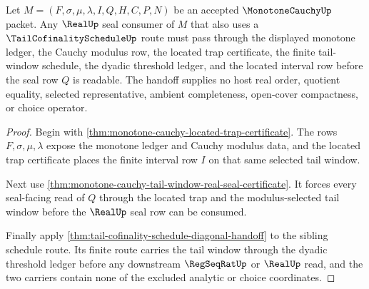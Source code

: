 \begin{theorem}
\label{thm:monotone-cauchy-window-tail-cofinality-handoff}
Let $M=(F,\sigma,\mu,\lambda,I,Q,H,C,P,N)$ be an accepted $\MonotoneCauchyUp$ packet. Any $\RealUp$ seal consumer of $M$ that also uses a $\TailCofinalityScheduleUp$ route must pass through the displayed monotone ledger, the Cauchy modulus row, the located trap certificate, the finite tail-window schedule, the dyadic threshold ledger, and the located interval row before the seal row $Q$ is readable. The handoff supplies no host real order, quotient equality, selected representative, ambient completeness, open-cover compactness, or choice operator.
\end{theorem}
\begin{proof}
Begin with \autoref{thm:monotone-cauchy-located-trap-certificate}. The rows $F,\sigma,\mu,\lambda$ expose the monotone ledger and Cauchy modulus data, and the located trap certificate places the finite interval row $I$ on that same selected tail window.

Next use \autoref{thm:monotone-cauchy-tail-window-real-seal-certificate}. It forces every seal-facing read of $Q$ through the located trap and the modulus-selected tail window before the $\RealUp$ seal row can be consumed.

Finally apply \autoref{thm:tail-cofinality-schedule-diagonal-handoff} to the sibling schedule route. Its finite route carries the tail window through the dyadic threshold ledger before any downstream $\RegSeqRatUp$ or $\RealUp$ read, and the two carriers contain none of the excluded analytic or choice coordinates.
\end{proof}

